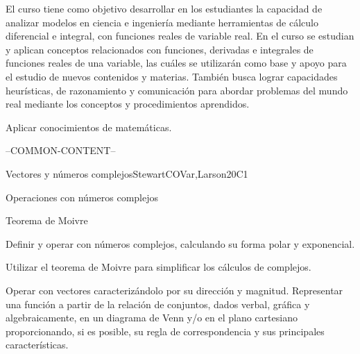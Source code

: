 \begin{syllabus}


\begin{justification}
El curso tiene como objetivo desarrollar en los estudiantes la capacidad de analizar modelos en ciencia e ingeniería mediante herramientas de cálculo
diferencial e integral, con funciones reales de variable real.
En el curso se estudian y aplican conceptos relacionados con funciones, derivadas e integrales de funciones reales de una variable, las cuáles se utilizarán como base y apoyo para el estudio de nuevos contenidos y materias.
También busca lograr capacidades heurísticas, de razonamiento y comunicación para abordar problemas del mundo real mediante los conceptos y procedimientos aprendidos.
\end{justification}

\begin{goals}
\item Aplicar conocimientos de matemáticas.
\end{goals}

--COMMON-CONTENT--

\begin{unit}{Vectores y números complejos}{}{StewartCOVar,Larson}{20}{C1}
   \begin{topics}
      \item Operaciones con números complejos
      \item Teorema de Moivre
   \end{topics}

   \begin{learningoutcomes}
      \item Definir y operar con números complejos, calculando su forma polar y exponencial.
      \item Utilizar el teorema de Moivre para simplificar los cálculos de complejos.
      \item Operar con vectores caracterizándolo por su dirección y magnitud.  Representar una función a partir de la relación de conjuntos,  dados verbal, gráfica y algebraicamente,  en un diagrama de Venn  y/o en el plano cartesiano proporcionando, si es posible, su regla de correspondencia  y sus principales características.
   \end{learningoutcomes}
\end{unit}


\end{syllabus}

